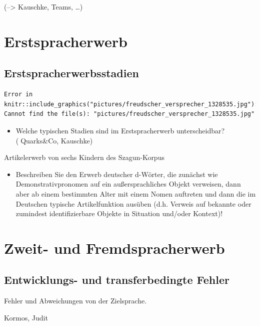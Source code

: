 \documentclass[
  letterpaper,
]{scrbook}
\providecommand{\tightlist}{%
  \setlength{\itemsep}{0pt}\setlength{\parskip}{0pt}}\usepackage{longtable,booktabs,array}
\begin{document}
(--\textgreater{} Kauschke, Teams, \ldots)

\part{Erstspracherwerb}

\hypertarget{sec-stadien}{%
\chapter{Erstspracherwerbsstadien}\label{sec-stadien}}

\begin{verbatim}
Error in knitr::include_graphics("pictures/freudscher_versprecher_1328535.jpg"): Cannot find the file(s): "pictures/freudscher_versprecher_1328535.jpg"
\end{verbatim}

\begin{itemize}
\tightlist
\item
  Welche typischen Stadien sind im Erstspracherwerb unterscheidbar?
  (Quarks\&Co, Kauschke)
\end{itemize}

Artikelerwerb von sechs Kindern des Szagun-Korpus

\begin{itemize}
\tightlist
\item
  Beschreiben Sie den Erwerb deutscher d-Wörter, die zunächst wie
  Demonstrativpronomen auf ein außersprachliches Objekt verweisen, dann
  aber ab einem bestimmten Alter mit einem Nomen auftreten und dann die
  im Deutschen typische Artikelfunktion ausüben (d.h. Verweis auf
  bekannte oder zumindest identifizierbare Objekte in Situation und/oder
  Kontext)!
\end{itemize}

\part{Zweit- und Fremdspracherwerb}

\hypertarget{sec-gender}{%
\chapter{Entwicklungs- und transferbedingte Fehler}\label{sec-gender}}

Fehler und Abweichungen von der Zielsprache.

Kormos, Judit
\end{document}
